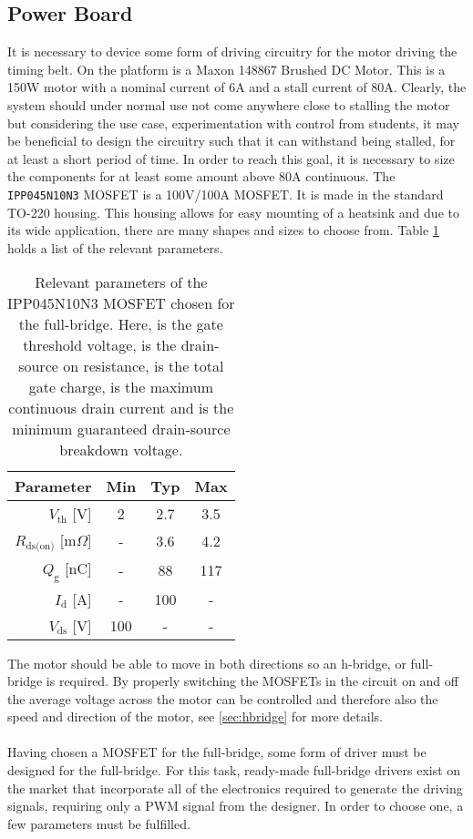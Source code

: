 \subsection{Power Board} %
\label{sub:power_board}
It is necessary to device some form of driving circuitry for the motor driving the timing belt.
On the platform is a Maxon 148867 Brushed DC Motor.
This is a 150W motor with a nominal current of 6A and a stall current of 80A.
Clearly, the system should under normal use not come anywhere close to stalling the motor but considering the use case, experimentation with control from students, it may be beneficial to design the circuitry such that it can withstand being stalled, for at least a short period of time.
In order to reach this goal, it is necessary to size the components for at least some amount above 80A continuous.
The \texttt{IPP045N10N3} MOSFET \cite{mosfet} is a 100V/100A MOSFET.
It is made in the standard TO-220 housing.
This housing allows for easy mounting of a heatsink and due to its wide application, there are many shapes and sizes to choose from.
Table \ref{tab:mosfetparameters} holds a list of the relevant parameters.

\begin{table}[tb]
	\centering
	\begin{tabular}{|r|c|c|c|}
	\hline
		\textbf{Parameter} & \textbf{Min} & \textbf{Typ} & \textbf{Max} \\
	\hline
		$V_{\text{th}}$ [V] & 2 & 2.7 & 3.5 \\
	\hline
		$R_{\text{ds(on)}}$ [m$\Omega$]& - & 3.6 & 4.2 \\
	\hline
		$Q_\text{g}$ [nC] & - & 88 & 117 \\
	\hline
		$I_\text{d}$ [A] & - & 100 & - \\
	\hline
		$V_{\text{ds}}$ [V] & 100 & - & - \\
	\hline
	\end{tabular}
	\caption{Relevant parameters of the IPP045N10N3 MOSFET \cite{mosfet} chosen for the full-bridge.
	Here, \vth is the gate threshold voltage, \ron is the drain-source on resistance, \qg is the total gate charge, \id is the maximum continuous drain current and \vds is the minimum guaranteed drain-source breakdown voltage.}
	\label{tab:mosfetparameters}
\end{table}

The motor should be able to move in both directions so an h-bridge, or full-bridge is required.
By properly switching the MOSFETs in the circuit on and off the average voltage across the motor can be controlled and therefore also the speed and direction of the motor, see \ref{sec:hbridge} for more details.
\\~\\
Having chosen a MOSFET for the full-bridge, some form of driver must be designed for the full-bridge.
For this task, ready-made full-bridge drivers exist on the market that incorporate all of the electronics required to generate the driving signals, requiring only a PWM signal from the designer.
In order to choose one, a few parameters must be fulfilled.


